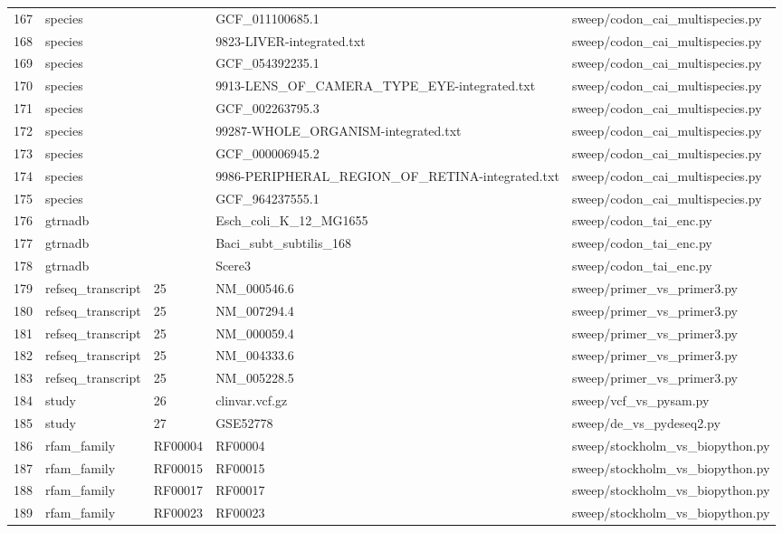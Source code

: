 {\begin{longtable}{rllp{3.2cm}p{4.2cm}}
167 & species &  & GCF\_011100685.1 & sweep/codon\_cai\_multispecies.py\\
168 & species &  & 9823-LIVER-integrated.txt & sweep/codon\_cai\_multispecies.py\\
169 & species &  & GCF\_054392235.1 & sweep/codon\_cai\_multispecies.py\\
170 & species &  & 9913-LENS\_OF\_CAMERA\_TYPE\_EYE-integrated.txt & sweep/codon\_cai\_multispecies.py\\
171 & species &  & GCF\_002263795.3 & sweep/codon\_cai\_multispecies.py\\
172 & species &  & 99287-WHOLE\_ORGANISM-integrated.txt & sweep/codon\_cai\_multispecies.py\\
173 & species &  & GCF\_000006945.2 & sweep/codon\_cai\_multispecies.py\\
174 & species &  & 9986-PERIPHERAL\_REGION\_OF\_RETINA-integrated.txt & sweep/codon\_cai\_multispecies.py\\
175 & species &  & GCF\_964237555.1 & sweep/codon\_cai\_multispecies.py\\
176 & gtrnadb &  & Esch\_coli\_K\_12\_MG1655 & sweep/codon\_tai\_enc.py\\
177 & gtrnadb &  & Baci\_subt\_subtilis\_168 & sweep/codon\_tai\_enc.py\\
178 & gtrnadb &  & Scere3 & sweep/codon\_tai\_enc.py\\
179 & refseq\_transcript & 25 & NM\_000546.6 & sweep/primer\_vs\_primer3.py\\
180 & refseq\_transcript & 25 & NM\_007294.4 & sweep/primer\_vs\_primer3.py\\
181 & refseq\_transcript & 25 & NM\_000059.4 & sweep/primer\_vs\_primer3.py\\
182 & refseq\_transcript & 25 & NM\_004333.6 & sweep/primer\_vs\_primer3.py\\
183 & refseq\_transcript & 25 & NM\_005228.5 & sweep/primer\_vs\_primer3.py\\
184 & study & 26 & clinvar.vcf.gz & sweep/vcf\_vs\_pysam.py\\
185 & study & 27 & GSE52778 & sweep/de\_vs\_pydeseq2.py\\
186 & rfam\_family & RF00004 & RF00004 & sweep/stockholm\_vs\_biopython.py\\
187 & rfam\_family & RF00015 & RF00015 & sweep/stockholm\_vs\_biopython.py\\
188 & rfam\_family & RF00017 & RF00017 & sweep/stockholm\_vs\_biopython.py\\
189 & rfam\_family & RF00023 & RF00023 & sweep/stockholm\_vs\_biopython.py\\

\end{longtable}}
